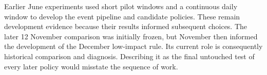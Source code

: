 Earlier June experiments used short pilot windows and a continuous daily window to develop the event pipeline and candidate policies. These remain development evidence because their results informed subsequent choices. The later 12 November comparison was initially frozen, but November then informed the development of the December low-impact rule. Its current role is consequently historical comparison and diagnosis. Describing it as the final untouched test of every later policy would misstate the sequence of work.
